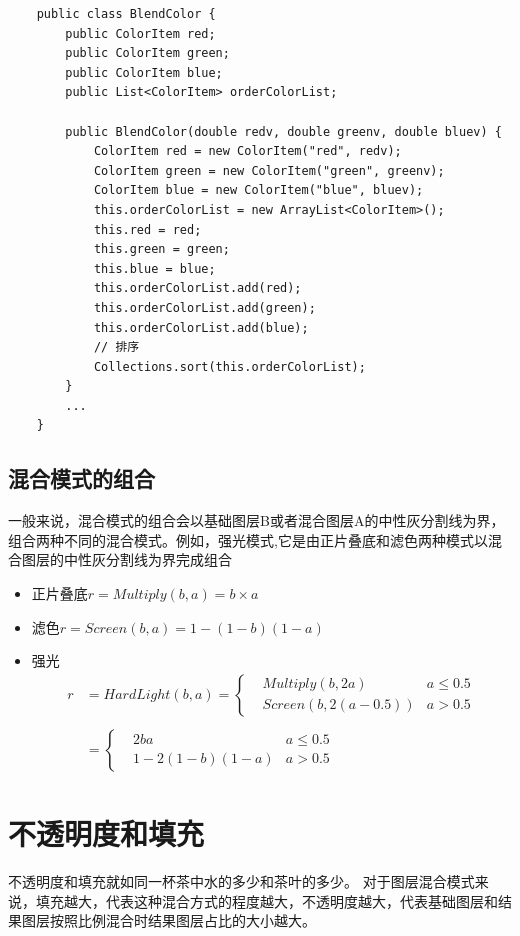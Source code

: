 \begin{lstlisting}
	public class BlendColor {
		public ColorItem red;
		public ColorItem green;
		public ColorItem blue;
		public List<ColorItem> orderColorList;
		
		public BlendColor(double redv, double greenv, double bluev) {
			ColorItem red = new ColorItem("red", redv);
			ColorItem green = new ColorItem("green", greenv);
			ColorItem blue = new ColorItem("blue", bluev);
			this.orderColorList = new ArrayList<ColorItem>();
			this.red = red;
			this.green = green;
			this.blue = blue;
			this.orderColorList.add(red);
			this.orderColorList.add(green);
			this.orderColorList.add(blue);
			// 排序
			Collections.sort(this.orderColorList);
		}
		...
	}
\end{lstlisting}


\section{ 混合模式的组合}
一般来说，混合模式的组合会以基础图层B或者混合图层A的中性灰分割线为界，组合两种不同的混合模式。例如，强光模式,它是由正片叠底和滤色两种模式以混合图层的中性灰分割线为界完成组合

\begin{itemize}
	\item 正片叠底$r=Multiply(b,a)=b\times a$
	\item 滤色$r=Screen(b,a)=1-(1-b)(1-a)$
	\item 强光\begin{equation}
		\begin{aligned}
			r&=HardLight(b,a)=\left\{ \begin{aligned}&Multiply(b,2a)&a\leq0.5\\ &Screen(b,2(a-0.5))&a > 0.5\end{aligned}\right.\\\\&=\left\{ \begin{aligned}&2ba&a\leq0.5\\ &1-2(1-b)(1-a)&a > 0.5\end{aligned}\right.
		\end{aligned}
	\end{equation}
\end{itemize}

\chapter{不透明度和填充}
\begin{introduction}
\item 不透明度和填充就如同一杯茶中水的多少和茶叶的多少。
对于图层混合模式来说，填充越大，代表这种混合方式的程度越大，不透明度越大，代表基础图层和结果图层按照比例混合时结果图层占比的大小越大。
\end{introduction}
